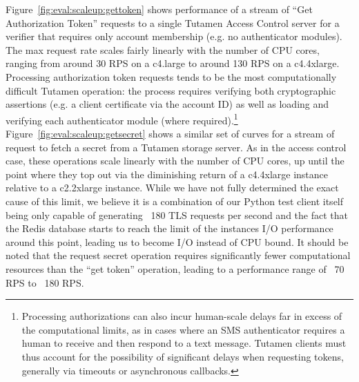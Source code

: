 Figure~\ref{fig:eval:scaleup:gettoken} shows performance of a stream
of ``Get Authorization Token'' requests to a single Tutamen Access
Control server for a verifier that requires only account membership
(e.g. no authenticator modules). The max request rate scales fairly
linearly with the number of CPU cores, ranging from around 30 RPS on a
c4.large to around 130 RPS on a c4.4xlarge. Processing authorization
token requests tends to be the most computationally difficult Tutamen
operation: the process requires verifying both cryptographic
assertions (e.g. a client certificate via the account ID) as well as
loading and verifying each authenticator module (where
required).\footnote{Processing authorizations can also incur
  human-scale delays far in excess of the computational limits, as in
  cases where an SMS authenticator requires a human to receive and
  then respond to a text message. Tutamen clients must thus account
  for the possibility of significant delays when requesting tokens,
  generally via timeouts or asynchronous callbacks.}
Figure~\ref{fig:eval:scaleup:getsecret} shows a similar set of curves
for a stream of request to fetch a secret from a Tutamen storage
server. As in the access control case, these operations scale linearly
with the number of CPU cores, up until the point where they top out
via the diminishing return of a c4.4xlarge instance relative to a
c2.2xlarge instance. While we have not fully determined the exact
cause of this limit, we believe it is a combination of our Python test
client itself being only capable of generating ~180 TLS requests per
second and the fact that the Redis database starts to reach the limit
of the instances I/O performance around this point, leading us to
become I/O instead of CPU bound. It should be noted that the request
secret operation requires significantly fewer computational resources
than the ``get token'' operation, leading to a performance range of
~70 RPS to ~180 RPS.

